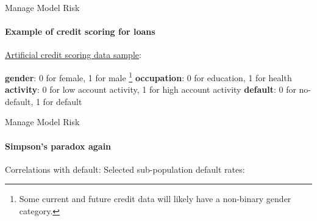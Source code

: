 \begin{frame}{Manage Model Risk}
    \framesubtitle{Example of credit scoring for loans}

    \href{https://github.com/munichpavel/risk-ai-workshop/blob/main/notebooks/data/default.csv}{Artificial credit scoring data sample}:
    \newline\newline
    
    \newline
    \newline
    \textbf{gender}: 0 for female, 1 for male \footnote{
        Some current and future credit data will likely have a non-binary gender category.
    } \newline
    \textbf{occupation}: 0 for education, 1 for health \newline
    \textbf{activity}: 0 for low account activity, 1 for high account activity \newline
    \textbf{default}: 0 for no-default, 1 for default \newline
\end{frame}

\begin{frame}{Manage Model Risk}
    \framesubtitle{Simpson's paradox again}
    Correlations with default:
    \newline
    \newline
    \newline
    \newline
    Selected sub-population default rates:
    \newline
    \newline
    \newline

\end{frame}


